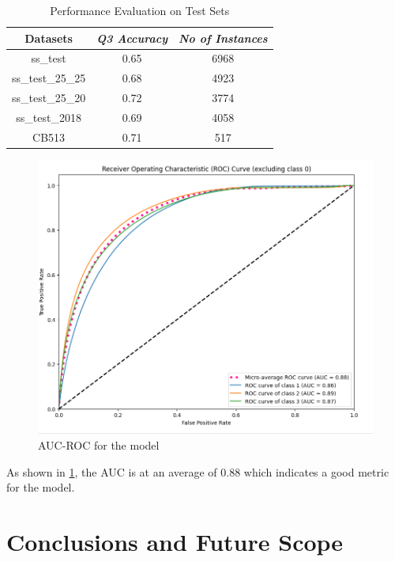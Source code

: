 \documentclass[conference]{IEEEtran}
\begin{document}
\begin{table}[htbp]
\caption{Performance Evaluation on Test Sets}
\begin{center}
\begin{tabular}{|c|c|c|}
\hline
\textbf{Datasets} & \textbf{\textit{Q3 Accuracy}} & \textbf{\textit{No of Instances}}\\
\hline
ss\_test& 0.65& 6968\\
\hline
ss\_test\_25\_25& 0.68&4923\\
\hline
ss\_test\_25\_20& 0.72&3774\\
\hline
ss\_test\_2018& 0.69&4058\\
\hline
CB513& 0.71&517\\
\hline
\end{tabular}
\label{tab1}
\end{center}
\end{table}

\begin{figure}[hbtp]
\centerline{\includegraphics[width=\linewidth]{figs/roc.png}}
\caption{
AUC-ROC for the model} 
\label{roc}
\end{figure}

As shown in \ref{roc}, the AUC is at an average of 0.88 which indicates a good metric for the model.

\section{Conclusions and Future Scope}
\end{document}
